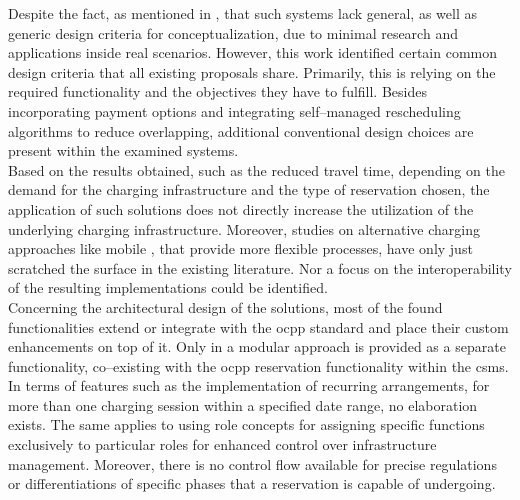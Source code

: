 \noindent Despite the fact, as mentioned in \cite{basmadjian_interoperable_2019}, that such systems lack general, as well as generic design criteria for conceptualization, due to minimal research and applications inside real scenarios.
However, this work identified certain common design criteria that all existing proposals share.
Primarily, this is relying on the required functionality and the objectives they have to fulfill.
Besides incorporating payment options and integrating self--managed rescheduling algorithms to reduce overlapping, additional conventional design choices are present within the examined systems. \\
\noindent Based on the results obtained, such as the reduced travel time, depending on the demand for the charging infrastructure and the type of reservation chosen, the application of such solutions does not directly increase the utilization of the underlying charging infrastructure.
Moreover, studies on alternative charging approaches like mobile , that provide more flexible processes, have only just scratched the surface in the existing literature. Nor a focus on the interoperability of the resulting implementations could be identified. \\
\noindent Concerning the architectural design of the solutions, most of the found functionalities extend or integrate with the \acrshort{ocpp} standard and place their custom enhancements on top of it.
Only in \cite{flocea_electric_2022} a modular approach is provided as a separate functionality, co--existing with the \acrshort{ocpp} reservation functionality within the \acrshort{csms}.
In terms of features such as the implementation of recurring arrangements, for more than one charging session within a specified date range, no elaboration exists.
The same applies to using role concepts for assigning specific functions exclusively to particular roles for enhanced control over infrastructure management.
Moreover, there is no control flow available for precise regulations or differentiations of specific phases that a reservation is capable of undergoing.
